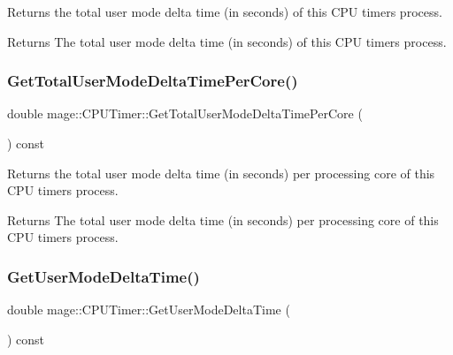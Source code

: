 Returns the total user mode delta time (in seconds) of this C\+PU timer\textquotesingle{}s process.

\begin{DoxyReturn}{Returns}
The total user mode delta time (in seconds) of this C\+PU timer\textquotesingle{}s process. 
\end{DoxyReturn}
\hypertarget{classmage_1_1_c_p_u_timer_a72bf36dbc5a67f99251125aa6e5c19f6}{}\label{classmage_1_1_c_p_u_timer_a72bf36dbc5a67f99251125aa6e5c19f6} 
\subsubsection{\texorpdfstring{Get\+Total\+User\+Mode\+Delta\+Time\+Per\+Core()}{GetTotalUserModeDeltaTimePerCore()}}
{\footnotesize\ttfamily double mage\+::\+C\+P\+U\+Timer\+::\+Get\+Total\+User\+Mode\+Delta\+Time\+Per\+Core (\begin{DoxyParamCaption}{ }\end{DoxyParamCaption}) const}

Returns the total user mode delta time (in seconds) per processing core of this C\+PU timer\textquotesingle{}s process.

\begin{DoxyReturn}{Returns}
The total user mode delta time (in seconds) per processing core of this C\+PU timer\textquotesingle{}s process. 
\end{DoxyReturn}
\hypertarget{classmage_1_1_c_p_u_timer_a999022706e5fa8ff4ee8c25de4be0e81}{}\label{classmage_1_1_c_p_u_timer_a999022706e5fa8ff4ee8c25de4be0e81} 
\subsubsection{\texorpdfstring{Get\+User\+Mode\+Delta\+Time()}{GetUserModeDeltaTime()}}
{\footnotesize\ttfamily double mage\+::\+C\+P\+U\+Timer\+::\+Get\+User\+Mode\+Delta\+Time (\begin{DoxyParamCaption}{ }\end{DoxyParamCaption}) const}

